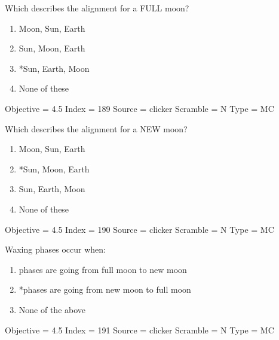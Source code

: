 \documentclass[11pt]{article}
\begin{document}
\begin{enumerate}
\begin{minipage}{\textwidth}
\begin{minipage}{\textwidth}
\item Which describes the alignment for a FULL moon?
\begin{multicols}{3}
\begin{enumerate} 
\setlength{\itemsep}{1pt} 
\setlength{\parskip}{0pt} 
\setlength{\parsep}{0pt}
\setlength{\multicolsep}{1pt} 
\item Moon, Sun, Earth
\item Sun, Moon, Earth
\item *Sun, Earth, Moon
\item None of these
\end{enumerate} 
\vfill 
\end{multicols}

Objective = 4.5
Index = 189
Source = clicker
Scramble = N
Type = MC
\end{minipage}
\end{minipage}
\vskip 0.20in

\begin{minipage}{\textwidth}
\begin{minipage}{\textwidth}
\item Which describes the alignment for a NEW moon?
\begin{multicols}{3}
\begin{enumerate} 
\setlength{\itemsep}{1pt} 
\setlength{\parskip}{0pt} 
\setlength{\parsep}{0pt}
\setlength{\multicolsep}{1pt} 
\item Moon, Sun, Earth
\item *Sun, Moon, Earth
\item Sun, Earth, Moon
\item None of these
\end{enumerate} 
\vfill 
\end{multicols}

Objective = 4.5
Index = 190
Source = clicker
Scramble = N
Type = MC
\end{minipage}
\end{minipage}
\vskip 0.20in

\begin{minipage}{\textwidth}
\begin{minipage}{\textwidth}
\item Waxing phases occur when:
\begin{enumerate} 
\setlength{\itemsep}{1pt} 
\setlength{\parskip}{0pt} 
\setlength{\parsep}{0pt}
\setlength{\multicolsep}{1pt} 
\item phases are going from full moon to new moon
\item *phases are going from new moon to full moon
\item None of the above
\end{enumerate} 
Objective = 4.5
Index = 191
Source = clicker
Scramble = N
Type = MC
\end{minipage}
\end{minipage}
\vskip 0.20in


\end{enumerate}
\end{document}
